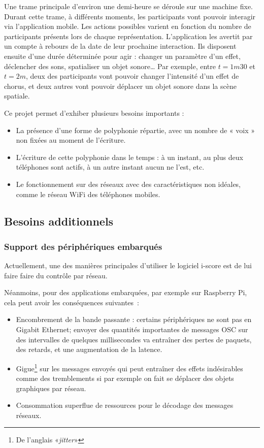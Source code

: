 \documentclass[10pt]{article}
\begin{document}
Une trame principale d'environ une demi-heure se déroule sur une machine fixe.
Durant cette trame, à différents moments, les participants vont pouvoir interagir via l'application mobile. 
Les actions possibles varient en fonction du nombre de participants présents lors de chaque représentation.
L'application les avertit par un compte à rebours de la date de leur prochaine interaction. 
Ils disposent ensuite d'une durée déterminée pour agir : changer un paramètre d'un effet, déclencher des sons, spatialiser un objet sonore\dots{}
Par exemple, entre $t=1m30$ et $t=2m$, deux des participants vont pouvoir changer l'intensité d'un effet de chorus, et deux autres vont pouvoir déplacer un objet sonore dans la scène spatiale. 

Ce projet permet d'exhiber plusieurs besoins importants : 
\begin{itemize}
    \item La présence d'une forme de polyphonie répartie, avec un nombre de « voix » non fixées au moment de l'écriture.
    \item L'écriture de cette polyphonie dans le temps : à un instant, au plus deux téléphones sont actifs, à  un autre instant aucun ne l'est, etc.
    \item Le fonctionnement sur des réseaux avec des caractéristiques non idéales, comme le réseau WiFi des téléphones mobiles.
\end{itemize}

\subsection{Besoins additionnels}
\subsubsection{Support des périphériques embarqués}
Actuellement, une des manières principales d'utiliser le logiciel i-score est de lui faire faire du contrôle par réseau. 

Néanmoins, pour des applications embarquées, par exemple sur Raspberry Pi, cela peut avoir les conséquences suivantes~: 
\begin{itemize}
    \item Encombrement de la bande passante : certains périphériques ne sont pas en Gigabit Ethernet; envoyer des quantités importantes de messages OSC sur des intervalles de quelques millisecondes va entraîner des pertes de paquets, des retards, et une augmentation de la latence.
    \item Gigue\footnote{De l'anglais «\textit{jitter}»} sur les messages envoyés qui peut entraîner des effets indésirables comme des tremblements si par exemple on fait se déplacer des objets graphiques par réseau.
    \item Consommation superflue de ressources pour le décodage des messages réseaux.
\end{itemize}
\end{document}
